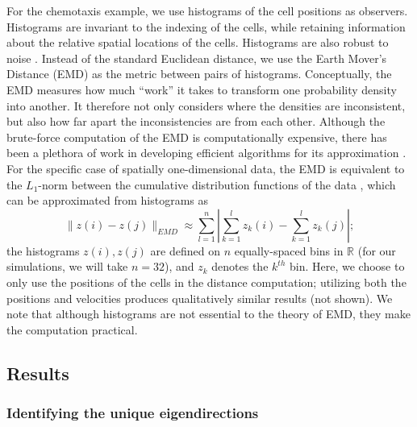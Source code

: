 \documentclass[3p]{elsarticle}
\begin{document}
For the chemotaxis example, we use histograms of the cell positions as observers.
%
Histograms are invariant to the indexing of the cells, while retaining information about the relative spatial locations of the cells.
%
Histograms are also robust to noise \cite{talmon2013empirical}.
%
Instead of the standard Euclidean distance, we use the Earth Mover's Distance (EMD) \cite{rubner2000earth} as the metric between pairs of histograms.
%
Conceptually, the EMD measures how much ``work'' it takes to transform one probability density into another.
%
It therefore not only considers where the densities are inconsistent, but also how far apart the inconsistencies are from each other.
%
Although the brute-force computation of the EMD is computationally expensive, 
there has been a plethora of work in developing efficient algorithms for its approximation \cite{Pele-eccv2008, Pele-iccv2009, leeb2014lipschitz}.
%
For the specific case of spatially one-dimensional data, the EMD is equivalent to the $L_1$-norm between the 
cumulative distribution functions of the data \cite{rubner2000perceptual}, which can be approximated from histograms as
\begin{equation}
\| z(i) - z(j) \|_{EMD} \approx \sum_{l=1}^{n} \left| \sum_{k=1}^l z_k(i) - \sum_{k=1}^l z_k(j) \right|;
\end{equation}
the histograms $z(i), z(j)$ are defined on $n$ equally-spaced bins in $\mathbb{R}$ (for our simulations, we will take $n=32$), and $z_k$ denotes the $k^{th}$ bin.
%
Here, we choose to only use the positions of the cells in the distance computation; utilizing both the positions and velocities produces qualitatively similar results (not shown).
%
We note that although histograms are not essential to the theory of EMD, they make the computation practical.


\subsection{Results}

\subsubsection{Identifying the unique eigendirections}
\end{document}

